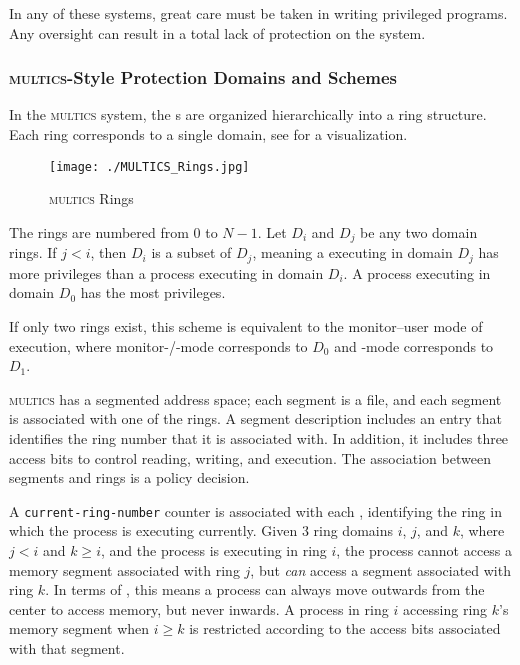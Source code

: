 In any of these systems, great care must be taken in writing privileged programs.
Any oversight can result in a total lack of protection on the system.

\subsubsection{\textsc{multics}-Style Protection Domains and Schemes}\label{subsubsec:MULTICS_Protections}
In the \textsc{multics} system, the s are organized hierarchically into a ring structure.
Each ring corresponds to a single domain, see  for a visualization.

\begin{figure}[h!tbp]
  \centering
  \texttt{[image: ./MULTICS\_Rings.jpg]}
  \caption{\textsc{multics} Rings}
  \label{fig:MULTICS_Rings}
\end{figure}

The rings are numbered from 0 to $N-1$.
Let $D_{i}$ and $D_{j}$ be any two domain rings.
If $j < i$, then $D_{i}$ is a subset of $D_{j}$, meaning a  executing in domain $D_{j}$ has more privileges than a process executing in domain $D_{i}$.
A process executing in domain $D_{0}$ has the most privileges.
\begin{remark*}
  If only two rings exist, this scheme is equivalent to the monitor–user mode of execution, where monitor-/-mode corresponds to $D_{0}$ and -mode corresponds to $D_{1}$.
\end{remark*}

\textsc{multics} has a segmented address space; each segment is a file, and each segment is associated with one of the rings.
A segment description includes an entry that identifies the ring number that it is associated with.
In addition, it includes three access bits to control reading, writing, and execution.
The association between segments and rings is a policy decision.

A \texttt{current-ring-number} counter is associated with each , identifying the ring in which the process is executing currently.
Given 3 ring domains $i$, $j$, and $k$, where $j < i$ and $k \geq i$, and the process is executing in ring $i$, the process cannot access a memory segment associated with ring $j$, but \emph{can} access a segment associated with ring $k$.
In terms of , this means a process can always move outwards from the center to access memory, but never inwards.
A process in ring $i$ accessing ring $k$'s memory segment when $i \geq k$ is restricted according to the access bits associated with that segment.

